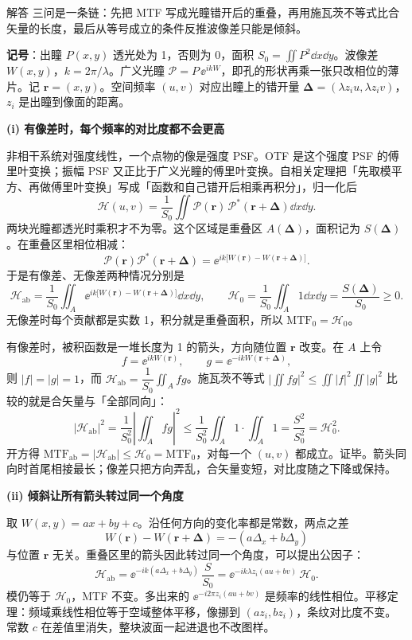 \begin{exam}{解答}
三问是一条链：先把 MTF 写成光瞳错开后的重叠，再用施瓦茨不等式比合矢量的长度，最后从等号成立的条件反推波像差只能是倾斜。

\textbf{记号}：出瞳 $P(x,y)$ 透光处为 1，否则为 0，面积 $S_0=\iint P^2\dd x\dd y$。波像差 $W(x,y)$，$k=2\pi/\lambda$。广义光瞳 $\mathcal P=P\,\ee^{ikW}$，即孔的形状再乘一张只改相位的薄片。记 $\bm r=(x,y)$。空间频率 $(u,v)$ 对应出瞳上的错开量 $\bm\Delta=(\lambda z_iu,\lambda z_iv)$，$z_i$ 是出瞳到像面的距离。

\textbf{(i) 有像差时，每个频率的对比度都不会更高}

非相干系统对强度线性，一个点物的像是强度 PSF。OTF 是这个强度 PSF 的傅里叶变换；振幅 PSF 又正比于广义光瞳的傅里叶变换。自相关定理把「先取模平方、再做傅里叶变换」写成「函数和自己错开后相乘再积分」，归一化后
\[
\mathcal H(u,v)=\frac{1}{S_0}\iint\mathcal P(\bm r)\,\mathcal P^*(\bm r+\bm\Delta)\dd x\dd y .
\]
两块光瞳都透光时乘积才不为零。这个区域是重叠区 $A(\bm\Delta)$，面积记为 $S(\bm\Delta)$。在重叠区里相位相减：
\[
\mathcal P(\bm r)\mathcal P^*(\bm r+\bm\Delta)=\ee^{ik\bigl[W(\bm r)-W(\bm r+\bm\Delta)\bigr]} .
\]
于是有像差、无像差两种情况分别是
\[
\mathcal H_{\text{ab}}=\frac1{S_0}\iint_{A}\ee^{ik\bigl[W(\bm r)-W(\bm r+\bm\Delta)\bigr]}\dd x\dd y,\qquad
\mathcal H_0=\frac1{S_0}\iint_A 1\dd x\dd y=\frac{S(\bm\Delta)}{S_0}\ge0 .
\]
无像差时每个贡献都是实数 1，积分就是重叠面积，所以 $\mathrm{MTF}_0=\mathcal H_0$。

有像差时，被积函数是一堆长度为 1 的箭头，方向随位置 $\bm r$ 改变。在 $A$ 上令
\[
f=\ee^{ikW(\bm r)},\qquad g=\ee^{-ikW(\bm r+\bm\Delta)},
\]
则 $|f|=|g|=1$，而 $\mathcal H_{\text{ab}}=\dfrac1{S_0}\displaystyle\iint_A fg$。施瓦茨不等式 $\bigl|\iint fg\bigr|^2\le\iint|f|^2\iint|g|^2$ 比较的就是合矢量与「全部同向」：
\[
|\mathcal H_{\text{ab}}|^2
=\frac1{S_0^2}\left|\iint_A fg\right|^2
\le\frac1{S_0^2}\iint_A 1\cdot\iint_A 1
=\frac{S^2}{S_0^2}
=\mathcal H_0^2 .
\]
开方得 $\mathrm{MTF}_{\text{ab}}=|\mathcal H_{\text{ab}}|\le\mathcal H_0=\mathrm{MTF}_0$，对每一个 $(u,v)$ 都成立。证毕。箭头同向时首尾相接最长；像差只把方向弄乱，合矢量变短，对比度随之下降或保持。

\textbf{(ii) 倾斜让所有箭头转过同一个角度}

取 $W(x,y)=ax+by+c$。沿任何方向的变化率都是常数，两点之差
\[
W(\bm r)-W(\bm r+\bm\Delta)=-(a\Delta_x+b\Delta_y)
\]
与位置 $\bm r$ 无关。重叠区里的箭头因此转过同一个角度，可以提出公因子：
\[
\mathcal H_{\text{ab}}=\ee^{-ik(a\Delta_x+b\Delta_y)}\,\frac{S}{S_0}
=\ee^{-ik\lambda z_i(au+bv)}\,\mathcal H_0 .
\]
模仍等于 $\mathcal H_0$，MTF 不变。多出来的 $\ee^{-i2\pi z_i(au+bv)}$ 是频率的线性相位。平移定理：频域乘线性相位等于空域整体平移，像挪到 $(az_i,bz_i)$，条纹对比度不变。常数 $c$ 在差值里消失，整块波面一起进退也不改图样。


\end{exam}
